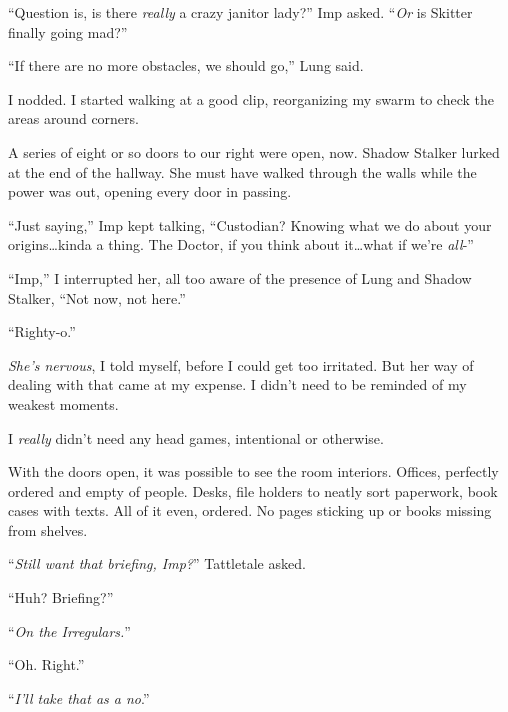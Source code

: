 ``Question is, is there \emph{reall}\emph{y }a crazy janitor lady?''  Imp asked.  ``\emph{Or} is Skitter finally going mad?''



``If there are no more obstacles, we should go,'' Lung said.



I nodded.  I started walking at a good clip, reorganizing my swarm to check the areas around corners.



A series of eight or so doors to our right were open, now.  Shadow Stalker lurked at the end of the hallway.  She must have walked through the walls while the power was out, opening every door in passing.



``Just saying,'' Imp kept talking, ``Custodian?  Knowing what we do about your origins\ldots kinda a thing.  The Doctor, if you think about it\ldots what if we're \emph{all}-''



``Imp,'' I interrupted her, all too aware of the presence of Lung and Shadow Stalker, ``Not now, not here.''



``Righty-o.''



\emph{She's nervous}, I told myself, before I could get too irritated.  But her way of dealing with that came at my expense.  I didn't need to be reminded of my weakest moments.



I \emph{really} didn't need any head games, intentional or otherwise.



With the doors open, it was possible to see the room interiors.  Offices, perfectly ordered and empty of people.  Desks, file holders to neatly sort paperwork, book cases with texts.  All of it even, ordered.  No pages sticking up or books missing from shelves.



``\emph{Still want that briefing, Imp?}'' Tattletale asked.



``Huh?  Briefing?''



``\emph{On the Irregulars.}''



``Oh.  Right.''



``\emph{I'll take that as a no}.''




